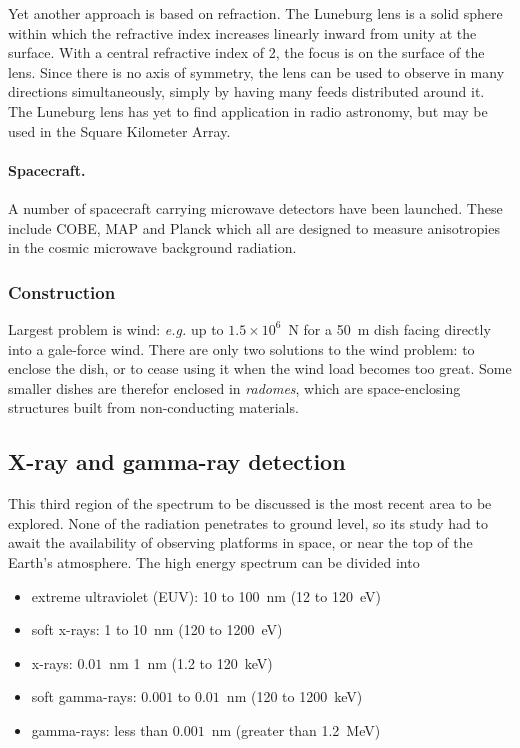 Yet another approach is based on refraction. The Luneburg lens is a solid sphere 
within which the refractive index increases linearly inward from unity at the surface.
With a central refractive index of 2, the focus is on the surface of the lens. Since there
is no axis of symmetry, the lens can be used to observe in many directions simultaneously,
simply by having many feeds distributed around it. The Luneburg lens has yet to 
find application in radio astronomy, but may be used in the Square Kilometer Array.

\paragraph{Spacecraft.} A number of spacecraft carrying microwave detectors have been launched. 
These include COBE, MAP and Planck which all are designed to measure anisotropies in
 the cosmic microwave background radiation.

\subsubsection{Construction}

Largest problem is wind: {\it e.g.} up to $1.5\times 10^6$~N for a 50~m dish 
facing directly into a gale-force wind. There are only two solutions to the wind problem:
to enclose the dish, or to cease using it when the wind load becomes too great. Some 
smaller dishes are therefor enclosed in {\it radomes}, which are space-enclosing structures
built from non-conducting materials.

\subsection{X-ray and gamma-ray detection}

This third region of the spectrum to be discussed is the most recent area
to be explored. None of the radiation penetrates to ground level, so its
study had to await the availability of observing platforms in space, or near
the top of the Earth's atmosphere. The high energy spectrum can be divided into
\begin{itemize}
\item extreme ultraviolet (EUV): 10 to 100~nm (12 to 120~eV)
\item soft x-rays: 1 to 10~nm (120 to 1200~eV)
\item x-rays: $0.01$~nm 1~nm (1.2 to 120~keV)
\item soft gamma-rays: $0.001$ to $0.01$~nm (120 to 1200~keV)
\item gamma-rays: less than $0.001$~nm (greater than 1.2~MeV)
\end{itemize}

